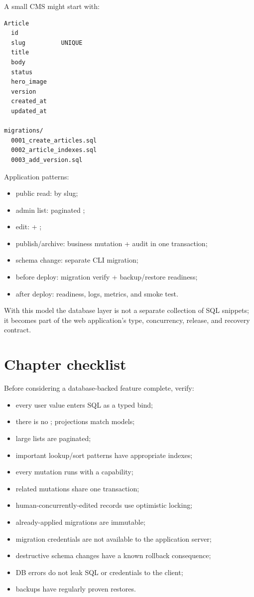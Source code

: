 A small CMS might start with:

\begin{lstlisting}
Article
  id
  slug          UNIQUE
  title
  body
  status
  hero_image
  version
  created_at
  updated_at

migrations/
  0001_create_articles.sql
  0002_article_indexes.sql
  0003_add_version.sql
\end{lstlisting}

Application patterns:

\begin{itemize}
\item public read:  by slug;
\item admin list: paginated ;
\item edit:  + ;
\item publish/archive: business mutation + audit in one transaction;
\item schema change: separate CLI migration;
\item before deploy: migration verify + backup/restore readiness;
\item after deploy: readiness, logs, metrics, and smoke test.
\end{itemize}

With this model the database layer is not a separate collection of SQL snippets; it becomes part of the web application's type, concurrency, release, and recovery contract.

\section{Chapter checklist}

Before considering a database-backed feature complete, verify:

\begin{itemize}
\item every user value enters SQL as a typed bind;
\item there is no ; projections match models;
\item large lists are paginated;
\item important lookup/sort patterns have appropriate indexes;
\item every mutation runs with a  capability;
\item related mutations share one transaction;
\item human-concurrently-edited records use optimistic locking;
\item already-applied migrations are immutable;
\item migration credentials are not available to the application server;
\item destructive schema changes have a known rollback consequence;
\item DB errors do not leak SQL or credentials to the client;
\item backups have regularly proven restores.
\end{itemize}
